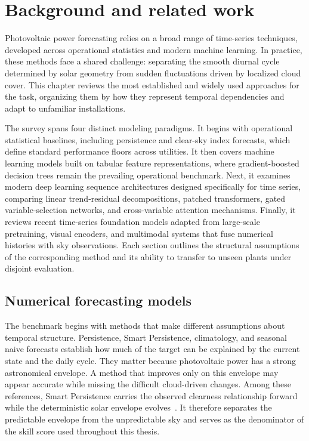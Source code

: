 \chapter{Background and related work}
\label{cha:related}

Photovoltaic power forecasting relies on a broad range of time-series techniques, developed across operational statistics and modern machine learning. In practice, these methods face a shared challenge: separating the smooth diurnal cycle determined by solar geometry from sudden fluctuations driven by localized cloud cover. This chapter reviews the most established and widely used approaches for the task, organizing them by how they represent temporal dependencies and adapt to unfamiliar installations.

The survey spans four distinct modeling paradigms. It begins with operational statistical baselines, including persistence and clear-sky index forecasts, which define standard performance floors across utilities. It then covers machine learning models built on tabular feature representations, where gradient-boosted decision trees remain the prevailing operational benchmark. Next, it examines modern deep learning sequence architectures designed specifically for time series, comparing linear trend-residual decompositions, patched transformers, gated variable-selection networks, and cross-variable attention mechanisms. Finally, it reviews recent time-series foundation models adapted from large-scale pretraining, visual encoders, and multimodal systems that fuse numerical histories with sky observations. Each section outlines the structural assumptions of the corresponding method and its ability to transfer to unseen plants under disjoint evaluation.

\section{Numerical forecasting models}
\label{sec:rw-numerical}

The benchmark begins with methods that make different assumptions about temporal structure. Persistence, Smart Persistence, climatology, and seasonal naive forecasts establish how much of the target can be explained by the current state and the daily cycle. They matter because photovoltaic power has a strong astronomical envelope. A method that improves only on this envelope may appear accurate while missing the difficult cloud-driven changes. Among these references, Smart Persistence carries the observed clearness relationship forward while the deterministic solar envelope evolves~\cite{haurwitz}. It therefore separates the predictable envelope from the unpredictable sky and serves as the denominator of the skill score used throughout this thesis.

